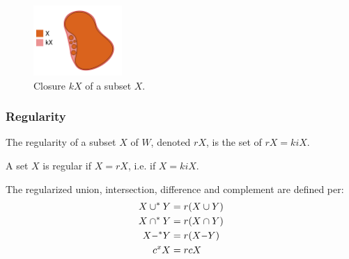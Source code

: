 \documentclass[a4paper,11pt,oneside]{article}
\newcommand{\minus}{\scalebox{0.9}[1.0]{$-$}} %
\begin{document}
\begin{figure}[ht]
	\begin{center}
		\includegraphics[width=0.3\textwidth]{section3/3.1/closure.png}
	\end{center}
	\caption{Closure $kX$ of a subset $X$.}
	\label{sect3:closure}
\end{figure}
    
\subsubsection{Regularity}
    
\begin{definition}[Regularity]
	The regularity of a subset $X$ of $W$, denoted $rX$, is the set of $rX = kiX$. \cite{mansfield_1987}
\end{definition}
\begin{definition}
	A set $X$ is regular if $X = rX$, i.e. if $X = kiX$. \cite{mansfield_1987}
\end{definition}
    
\begin{definition}
	The regularized union, intersection, difference and complement are defined per:
	\begin{align*} 
		X \cup^* Y   & = r(X \cup Y)    \\
		X \cap^* Y   & = r(X \cap Y)    \\
		X \minus^*Y & = r(X \minus Y) \\
		c{^x}X       & = rcX            
	\end{align*}
\end{definition}
    
\end{document}
